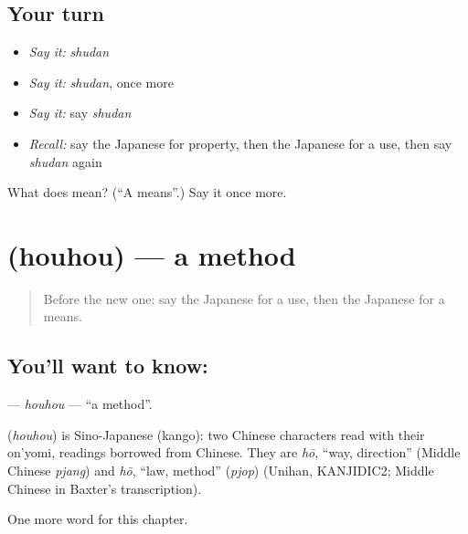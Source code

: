 \subsection*{Your turn}
\begin{itemize}
\raggedright
  \item \emph{Say it:} \emph{shudan}
  \item \emph{Say it:} \emph{shudan}, once more
  \item \emph{Say it:} say \emph{shudan}
  \item \emph{Recall:} say the Japanese for property, then the Japanese for a use, then say \emph{shudan} again
\end{itemize}

\begin{tcolorbox}[breakable,colback=teal!4,colframe=teal!35!black,title={Before you move on}]
What does  mean? (\textquotedblleft{}A means\textquotedblright{}.) Say it once more.
\end{tcolorbox}
\section[\texorpdfstring{\ja{ほうほう} (houhou)}{ほうほう (houhou)}]{ (houhou) — a method}

\label{lesson:JA-C97-houhou}



\begin{quote}
Before the new one: say the Japanese for a use, then the Japanese for a means.
\end{quote}

\subsection*{You'll want to know: }
\textbf{} — \emph{houhou} — \textquotedblleft{}a method\textquotedblright{}.

\begin{cousinweb}
\textbf{} (\emph{houhou}) is Sino-Japanese (kango): two Chinese characters read with their on'yomi, readings borrowed from Chinese. They are \emph{hō}, \textquotedblleft{}way, direction\textquotedblright{} (Middle Chinese \emph{pjang}) and \emph{hō}, \textquotedblleft{}law, method\textquotedblright{} (\emph{pjop}) (Unihan, KANJIDIC2; Middle Chinese in Baxter's transcription).
\end{cousinweb}

\begin{grammarlens}[title={What you've built}]
One more word for this chapter.
\end{grammarlens}

